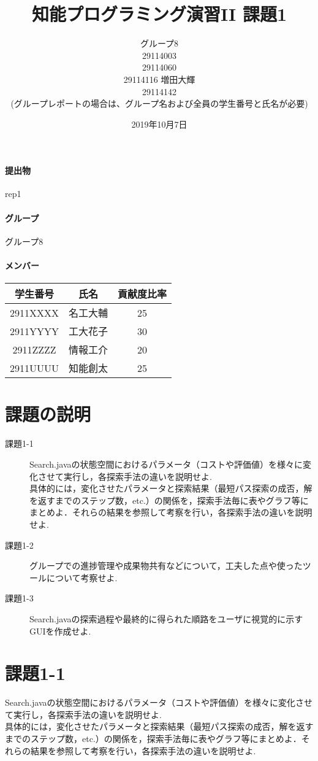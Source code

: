 \documentclass[uplatex,12pt]{jsarticle}
\title{知能プログラミング演習II 課題1}
\author{グループ8\\
  29114003 \\
  29114060 \\
  29114116 増田大輝\\
  29114142 \\
  {\small (グループレポートの場合は、グループ名および全員の学生番号と氏名が必要)}
}
\date{2019年10月7日}
\begin{document}
\maketitle

\paragraph{提出物} rep1
\paragraph{グループ} グループ8

\paragraph{メンバー}
\begin{tabular}{|c|c|c|}
  \hline
  学生番号&氏名&貢献度比率\\
  \hline\hline
  2911XXXX&名工大輔&25\\
  \hline
  2911YYYY&工大花子&30\\
  \hline
  2911ZZZZ&情報工介&20\\
  \hline
  2911UUUU&知能創太&25\\
  \hline
\end{tabular}



\section{課題の説明}
\begin{description}
\item[課題1-1] Search.javaの状態空間におけるパラメータ（コストや評価値）を様々に変化させて実行し，各探索手法の違いを説明せよ. \\
具体的には，変化させたパラメータと探索結果（最短パス探索の成否，解を返すまでのステップ数，etc.）の関係を，探索手法毎に表やグラフ等にまとめよ．それらの結果を参照して考察を行い，各探索手法の違いを説明せよ. \\
\item[課題1-2] グループでの進捗管理や成果物共有などについて，工夫した点や使ったツールについて考察せよ.
\item[課題1-3] Search.javaの探索過程や最終的に得られた順路をユーザに視覚的に示すGUIを作成せよ. 
\end{description}


\section{課題1-1}
\begin{screen}
  Search.javaの状態空間におけるパラメータ（コストや評価値）を様々に変化させて実行し，各探索手法の違いを説明せよ. \\
  具体的には，変化させたパラメータと探索結果（最短パス探索の成否，解を返すまでのステップ数，etc.）の関係を，探索手法毎に表やグラフ等にまとめよ．それらの結果を参照して考察を行い，各探索手法の違いを説明せよ.
\end{screen}
\end{document}
